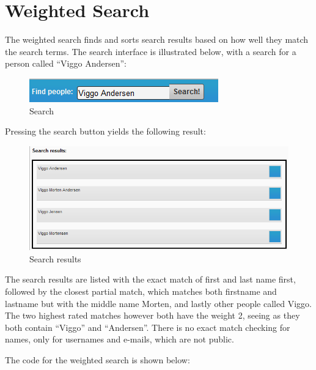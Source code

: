 \section{Weighted Search}
The weighted search finds and sorts search results based on how well they match the search terms. 
The search interface is illustrated below, with a search for a person called ``Viggo Andersen'':
\begin{figure}[h]
	\centering
		\includegraphics{implementation/figures/search.png}
	\caption{Search}
	\label{fig:search}
\end{figure}

Pressing the search button yields the following result:
\begin{figure}[ht]
	\centering
		\includegraphics[scale = 0.65]{implementation/figures/results.png}
	\caption{Search results}
	\label{fig:searchresults}
\end{figure}

The search results are listed with the exact match of first and last name first, followed by the closest partial match, which matches both firstname and lastname but with the middle name Morten, and lastly other people called Viggo. The two highest rated matches however both have the weight 2, seeing as they both contain ``Viggo'' and ``Andersen''. There is no exact match checking for names, only for usernames and e-mails, which are not public.

The code for the weighted search is shown below:

